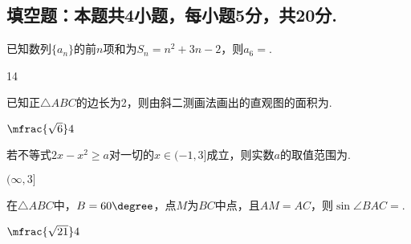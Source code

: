 \begin{exercise}
\section{填空题：本题共4小题，每小题5分，共20分.}
  \item%
    已知数列$\{a_n\}$的前$n$项和为$S_n=n^2+3n-2$，则$a_6=$\tk.
    \begin{answer}
      14
    \end{answer}
  \item%
    已知正$\triangle{ABC}$的边长为2，则由斜二测画法画出的直观图的面积为\tk.
     \begin{answer}
       $\mfrac{\sqrt6}4$
     \end{answer}
  \item%
    若不等式$2x-x^2\geqslant a$对一切的$x\in(-1,3]$成立，则实数$a$的取值范围为\tk.
    \begin{answer}
      $(\infty,3]$
    \end{answer}
  \item%
   在$\triangle{ABC}$中，$B=60\degree$，点$M$为$BC$中点，且$AM=AC$，则$\sin\angle{BAC}=$\tk.
   \begin{answer}
     $\mfrac{\sqrt{21}}4$
   \end{answer}

\end{exercise}
